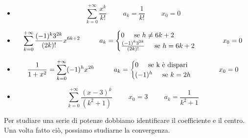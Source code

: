\begin{example}
    \begin{itemize}
        \item \begin{equation*}\sum^{+\infty}_{k=0}\frac{x^k}{k!}\hspace{1cm}a_k=\frac{1}{k!}\hspace{1cm}x_0=0\end{equation*}
        \item \begin{equation*}\sum^{+\infty}_{k=0}\frac{(-1)^k3^{2k}}{(2k)!}x^{6k+2}\hspace{1cm}a_k=\begin{cases}
            0 \hspace{0.5cm}\text{se } h\neq6k+2\\
            \frac{(-1)^k3^{2k}}{(2k)!}\hspace{0.5cm}\text{se }h=6k+2
        \end{cases}\hspace{1cm}x_0=0\end{equation*}
        
        \item \begin{equation*}\frac{1}{1+x^2}=\sum^{+\infty}_{k=0}(-1)^hx^{2h}\hspace{1cm}a_k=\begin{cases}
            0 \hspace{0.5cm}\text{se k è dispari}\\
            (-1)^h\hspace{0.5cm}\text{se }k=2h
        \end{cases}\hspace{1cm}x_0=0\end{equation*}
        
        \item \begin{equation*}\sum^{+\infty}_{k=0}\frac{(x-3)^k}{(k^2+1)}\hspace{1cm}x_0=3\hspace{1cm}a_k=\frac{1}{k^2+1}\end{equation*}
        
    \end{itemize}
\end{example}

Per studiare una serie di potenze dobbiamo identificare il coefficiente e il centro. Una volta fatto ciò, possiamo studiarne la convergenza.

